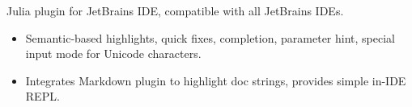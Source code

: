 \documentclass{resume}
\begin{document}
Julia plugin for JetBrains IDE, compatible with all JetBrains IDEs.
\begin{itemize}
  \item Semantic-based highlights, quick fixes, completion, parameter hint, special input mode for Unicode characters.
  \item Integrates Markdown plugin to highlight doc strings, provides simple in-IDE REPL.
\end{itemize}


\end{document}

